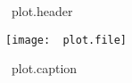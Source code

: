 \begin{figure}[H]
\begin{plotbox}
~plot.header
\end{plotbox}
\begin{mdframed}[skipabove=0pt, topline=false]
\begin{center}
\texttt{[image: ~plot.file]}
\caption{~plot.caption}
\label{~plot.label}
\end{center}
\end{mdframed}
\end{figure}
